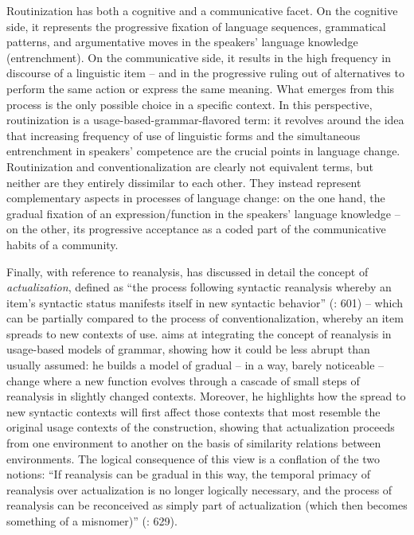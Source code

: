 Routinization has both a cognitive and a communicative facet. On the cognitive side, it represents the progressive fixation of language sequences, grammatical patterns, and argumentative moves in the speakers’ language knowledge (entrenchment). On the communicative side, it results in the high frequency in discourse of a linguistic item – and in the progressive ruling out of alternatives to perform the same action or express the same meaning. What emerges from this process is the only possible choice in a specific context. In this perspective, routinization is a usage-based-grammar-flavored term: it revolves around the idea that increasing frequency of use of linguistic forms and the simultaneous entrenchment in speakers’ competence are the crucial points in language change. Routinization and conventionalization are clearly not equivalent terms, but neither are they entirely dissimilar to each other. They instead represent complementary aspects in processes of language change: on the one hand, the gradual fixation of an expression/function in the speakers’ language knowledge – on the other, its progressive acceptance as a coded part of the communicative habits of a community.

Finally, with reference to reanalysis, \citet{Smet2012,Smet2014} has discussed in detail the concept of \textit{actualization}, defined as “the process following syntactic reanalysis whereby an item’s syntactic status manifests itself in new syntactic behavior” (\citealt{Smet2012}: 601) – which can be partially compared to the process of conventionalization, whereby an item spreads to new contexts of use. \citet{Smet2014} aims at integrating the concept of reanalysis in usage-based models of grammar, showing how it could be less abrupt than usually assumed: he builds a model of gradual – in a way, barely noticeable – change where a new function evolves through a cascade of small steps of reanalysis in slightly changed contexts. Moreover, he highlights how the spread to new syntactic contexts will first affect those contexts that most resemble the original usage contexts of the construction, showing that actualization proceeds from one environment to another on the basis of similarity relations between environments. The logical consequence of this view is a conflation of the two notions: “If reanalysis can be gradual in this way, the temporal primacy of reanalysis over actualization is no longer logically necessary, and the process of reanalysis can be reconceived as simply part of actualization (which then becomes something of a misnomer)” (\citealt{Smet2012}: 629).

